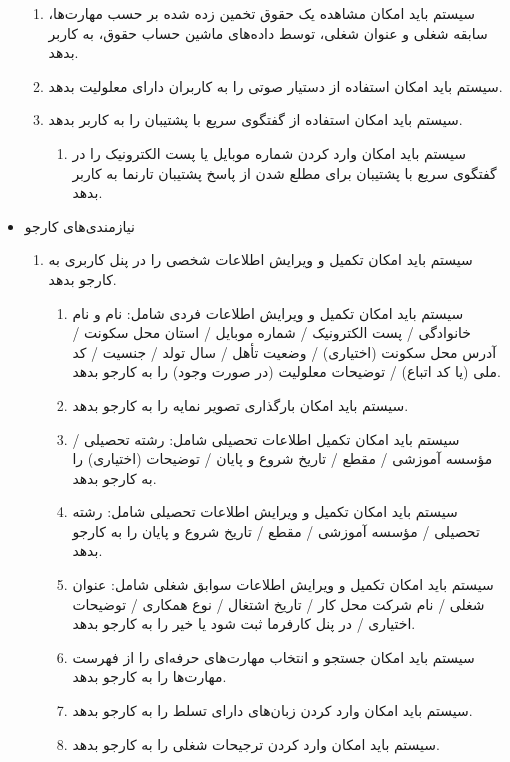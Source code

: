 \documentclass[12pt]{article}
\begin{document}
\begin{itemize}
\begin{enumerate}
			\item سیستم باید امکان مشاهده یک حقوق تخمین زده شده بر حسب مهارت‌ها، سابقه شغلی و عنوان شغلی، توسط داده‌های ماشین حساب حقوق، به کاربر بدهد.
			\item سیستم باید امکان استفاده از دستیار صوتی را به کاربران دارای معلولیت بدهد.
			\item سیستم باید امکان استفاده از گفتگوی سریع با پشتیبان را به کاربر بدهد.
			\begin{enumerate}
				\renewcommand{\labelenumii}{-R\arabic{enumi}.\arabic{enumii}}
				\item سیستم باید امکان وارد کردن شماره موبایل یا پست الکترونیک را در گفتگوی سریع با پشتیبان برای مطلع شدن از پاسخ پشتیبان تارنما به کاربر بدهد.
			\end{enumerate}
		\end{enumerate}
		\item
		نیازمندی‌های کارجو
		\begin{enumerate}
			\renewcommand{\labelenumi}{-R\arabic{enumi}}
			\setcounter{enumi}{21}
			\item سیستم باید امکان تکمیل و ویرایش اطلاعات شخصی را در پنل کاربری به کارجو بدهد.
			\begin{enumerate}
				\renewcommand{\labelenumii}{-R\arabic{enumi}.\arabic{enumii}}
				\item سیستم باید امکان تکمیل و ویرایش اطلاعات فردی شامل: نام و نام خانوادگی / پست الکترونیک / شماره موبایل / استان محل سکونت / آدرس محل سکونت (اختیاری) / وضعیت تأهل / سال تولد / جنسیت / کد ملی (یا کد اتباع) / توضیحات معلولیت (در صورت وجود) را به کارجو بدهد.
				\item سیستم باید امکان بارگذاری تصویر نمایه را به کارجو بدهد.
				\item سیستم باید امکان تکمیل اطلاعات تحصیلی شامل: رشته تحصیلی / مؤسسه آموزشی / مقطع / تاریخ شروع و پایان / توضیحات (اختیاری) را به کارجو بدهد.
				\item سیستم باید امکان تکمیل و ویرایش اطلاعات تحصیلی شامل: رشته تحصیلی / مؤسسه آموزشی / مقطع / تاریخ شروع و پایان را به کارجو بدهد.
				\item سیستم باید امکان تکمیل و ویرایش اطلاعات سوابق شغلی شامل: عنوان شغلی / نام شرکت محل کار / تاریخ اشتغال / نوع همکاری / توضیحات اختیاری / در پنل کارفرما ثبت شود یا خیر را به کارجو بدهد.
				\item سیستم باید امکان جستجو و انتخاب مهارت‌های حرفه‌ای را از فهرست مهارت‌ها را به کارجو بدهد.
				\item سیستم باید امکان وارد کردن زبان‌های دارای تسلط را به کارجو بدهد.
				\item سیستم باید امکان وارد کردن ترجیحات شغلی را به کارجو بدهد.

\end{enumerate}
\end{enumerate}
\end{itemize}
\end{document}
